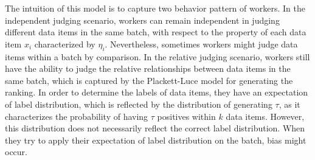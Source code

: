 
The intuition of this model is to capture two behavior pattern of workers.
In the independent judging scenario,
workers can remain independent in judging different data items in the same batch,
with respect to the property of each data item $x_i$ characterized by $\eta_i$.
Nevertheless, sometimes workers might judge data items within a batch by comparison.
In the relative judging scenario,
workers still have the ability to judge the relative relationships between data items in the same batch,
which is captured by the Plackett-Luce model for generating the ranking.
In order to determine the labels of data items,
they have an expectation of label distribution,
which is reflected by the distribution of generating $\tau$,
as it characterizes the probability of having $\tau$ positives within $k$ data items.
However, this distribution does not necessarily reflect the correct label distribution.
When they try to apply their expectation of label distribution on the batch, bias might occur.

